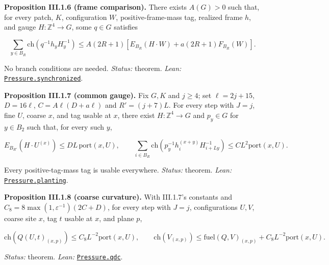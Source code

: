 \documentclass[
  letterpaper,
  11pt]{article}
\begin{document}
\textbf{Proposition III.1.6 (frame comparison).} There exists \(A(G)>0\)
such that, for every patch, \(K\), configuration \(W\),
positive-frame-mass tag, realized frame \(h\), and gauge
\(H:\mathbb Z^4\to G\), some \(q\in G\) satisfies

\[\sum_{y\in B_R}\mathrm{ch}(q^{-1}h_yH_y^{-1})\le A(2R+1)[E_{B_R}(H\cdot W)+a(2R+1)F_{B_R}(W)].\]

No branch conditions are needed. \emph{Status:} theorem. \emph{Lean:}
\href{https://github.com/yang-mills-group/OpenAI-YM-20261028/blob/3456e5e75cf8d4cd558955a5c7638fba2d68f464/YM/Pressure/Gauge.lean\#L135-L162}{\texttt{Pressure.synchronized}}.

\textbf{Proposition III.1.7 (common gauge).} Fix \(G,K\) and \(j\ge4\);
set \(\ell=2j+15\), \(D=16\ell\), \(C=A\ell(D+a\ell)\) and
\(R'=(j+7)L\). For every step with \(J=j\), fine \(U\), coarse \(x\),
and tag usable at \(x\), there exist \(H:\mathbb Z^4\to G\) and
\(p_y\in G\) for \(y\in B_2\) such that, for every such \(y\),

\[E_{B_{R'}}(H\cdot U^{(x)})\le DL\,\mathrm{port}(x,U),\qquad\sum_{i\in B_R}\mathrm{ch}(p_y^{-1}h_i^{(x+y)}H_{i+Ly}^{-1})\le CL^2\mathrm{port}(x,U).\]

Every positive-tag-mass tag is usable everywhere. \emph{Status:}
theorem. \emph{Lean:}
\href{https://github.com/yang-mills-group/OpenAI-YM-20261028/blob/3456e5e75cf8d4cd558955a5c7638fba2d68f464/YM/Pressure/Cost.lean\#L72-L122}{\texttt{Pressure.planting}}.

\textbf{Proposition III.1.8 (coarse curvature).} With III.1.7's
constants and \(C_8=8\max(1,\varepsilon^{-1})(2C+D)\), for every step
with \(J=j\), configurations \(U,V\), coarse site \(x\), tag \(t\)
usable at \(x\), and plane \(p\),

\[\mathrm{ch}(Q(U,t)_{(x,p)})\le C_8L^{-2}\mathrm{port}(x,U),\qquad\mathrm{ch}(V_{(x,p)})\le\mathrm{fuel}(Q,V)_{(x,p)}+C_8L^{-2}\mathrm{port}(x,U).\]

\emph{Status:} theorem. \emph{Lean:}
\href{https://github.com/yang-mills-group/OpenAI-YM-20261028/blob/3456e5e75cf8d4cd558955a5c7638fba2d68f464/YM/Pressure/Cost.lean\#L210-L252}{\texttt{Pressure.qdc}}.
\end{document}
